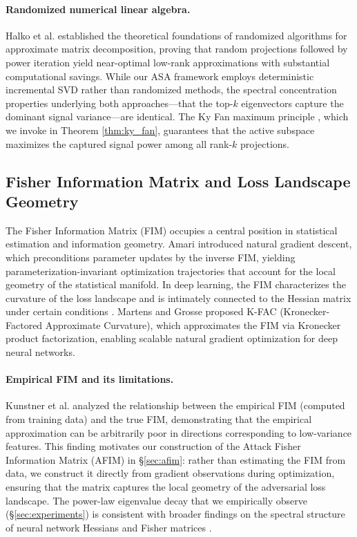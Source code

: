 \documentclass[preprint,12pt]{elsarticle}
\begin{document}
\paragraph{Randomized numerical linear algebra.} Halko et al. \cite{halko2011finding} established the theoretical foundations of randomized algorithms for approximate matrix decomposition, proving that random projections followed by power iteration yield near-optimal low-rank approximations with substantial computational savings. While our ASA framework employs deterministic incremental SVD rather than randomized methods, the spectral concentration properties underlying both approaches---that the top-$k$ eigenvectors capture the dominant signal variance---are identical. The Ky Fan maximum principle \cite{fan1949theorem}, which we invoke in Theorem \ref{thm:ky_fan}, guarantees that the active subspace maximizes the captured signal power among all rank-$k$ projections.

\subsection{Fisher Information Matrix and Loss Landscape Geometry}
\label{sec:rw_fim}

The Fisher Information Matrix (FIM) occupies a central position in statistical estimation and information geometry. Amari \cite{amari1998natural} introduced natural gradient descent, which preconditions parameter updates by the inverse FIM, yielding parameterization-invariant optimization trajectories that account for the local geometry of the statistical manifold. In deep learning, the FIM characterizes the curvature of the loss landscape and is intimately connected to the Hessian matrix under certain conditions \cite{pascanu2014saddle}. Martens and Grosse \cite{martens2015optimizing} proposed K-FAC (Kronecker-Factored Approximate Curvature), which approximates the FIM via Kronecker product factorization, enabling scalable natural gradient optimization for deep neural networks.

\paragraph{Empirical FIM and its limitations.} Kunstner et al. \cite{kunstner2019limitations} analyzed the relationship between the empirical FIM (computed from training data) and the true FIM, demonstrating that the empirical approximation can be arbitrarily poor in directions corresponding to low-variance features. This finding motivates our construction of the Attack Fisher Information Matrix (AFIM) in \S\ref{sec:afim}: rather than estimating the FIM from data, we construct it directly from gradient observations during optimization, ensuring that the matrix captures the local geometry of the adversarial loss landscape. The power-law eigenvalue decay that we empirically observe (\S\ref{sec:experiments}) is consistent with broader findings on the spectral structure of neural network Hessians and Fisher matrices \cite{li2018visualizing}.
\end{document}
